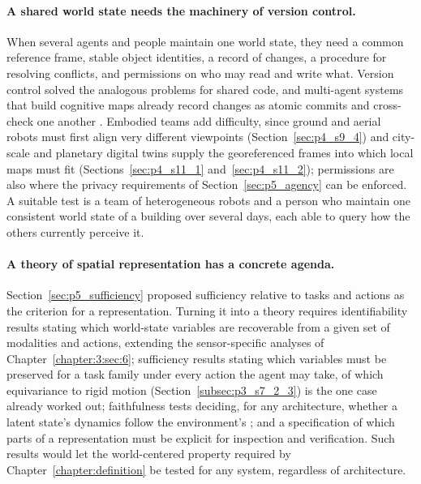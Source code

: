 \paragraph{A shared world state needs the machinery of version control.}
When several agents and people maintain one world state, they need a common reference frame, stable object identities, a record of changes, a procedure for resolving conflicts, and permissions on who may read and write what.
Version control solved the analogous problems for shared code, and multi-agent systems that build cognitive maps already record changes as atomic commits and cross-check one another \cite{zhang2026cocosi}.
Embodied teams add difficulty, since ground and aerial robots must first align very different viewpoints (Section~\ref{sec:p4_s9_4}) and city-scale and planetary digital twins supply the georeferenced frames into which local maps must fit (Sections~\ref{sec:p4_s11_1} and~\ref{sec:p4_s11_2}); permissions are also where the privacy requirements of Section~\ref{sec:p5_agency} can be enforced.
A suitable test is a team of heterogeneous robots and a person who maintain one consistent world state of a building over several days, each able to query how the others currently perceive it.

\paragraph{A theory of spatial representation has a concrete agenda.}
Section~\ref{sec:p5_sufficiency} proposed sufficiency relative to tasks and actions as the criterion for a representation.
Turning it into a theory requires identifiability results stating which world-state variables are recoverable from a given set of modalities and actions, extending the sensor-specific analyses of Chapter~\ref{chapter:3:sec:6}; sufficiency results stating which variables must be preserved for a task family under every action the agent may take, of which equivariance to rigid motion (Section~\ref{subsec:p3_s7_2_3}) is the one case already worked out; faithfulness tests deciding, for any architecture, whether a latent state's dynamics follow the environment's \cite{gonzalezlaiz2026limits}; and a specification of which parts of a representation must be explicit for inspection and verification.
Such results would let the world-centered property required by Chapter~\ref{chapter:definition} be tested for any system, regardless of architecture.
